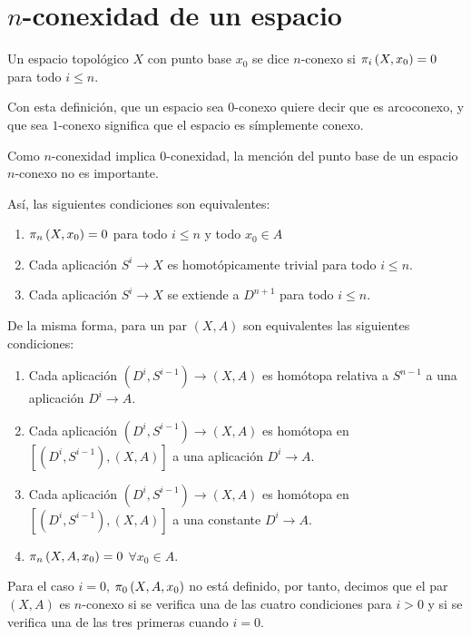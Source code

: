 \section{$n$-conexidad de un espacio}
\begin{defin}
Un espacio topológico $X$ con punto base $x_0$ se dice $n$-conexo si $\pi_{i}\left(X, x_0\right) = 0$ para todo $i \leq n$.
\end{defin}
Con esta definición, que un espacio sea $0$-conexo quiere decir que es arcoconexo, y que sea $1$-conexo significa que el espacio es símplemente conexo. \par
Como $n$-conexidad implica $0$-conexidad, la mención del punto base de un espacio $n$-conexo no es importante. \par
Así, las siguientes condiciones son equivalentes:
\begin{enumerate}
\item $\pi_{n}\left(X, x_0\right) = 0$ para todo $i \leq n$ y todo $x_0 \in A$
\item Cada aplicación $S^i \longrightarrow X$ es homotópicamente trivial para todo $i \leq n$.
\item Cada aplicación $S^i \longrightarrow X$ se extiende a $D^{n+1}$ para todo $i \leq n$.
\end{enumerate}
De la misma forma, para un par $(X, A)$ son equivalentes las siguientes condiciones:
\begin{enumerate}
\item Cada aplicación $(D^i, S^{i-1}) \longrightarrow (X, A)$ es homótopa relativa a $S^{n-1}$ a una aplicación $D^i \longrightarrow A$.
\item Cada aplicación $(D^i, S^{i-1}) \longrightarrow (X, A)$ es homótopa en $[(D^i, S^{i-1}), (X, A)]$ a una aplicación $D^i \longrightarrow A$.
\item Cada aplicación $(D^i, S^{i-1}) \longrightarrow (X, A)$ es homótopa en $[(D^i, S^{i-1}), (X, A)]$ a una constante $D^i \longrightarrow A$.
\item $\pi_{n}\left(X, A, x_0\right) = 0$ $\forall x_0 \in A$.
\end{enumerate}
Para el caso $i = 0$, $\pi_{0}\left(X, A, x_0\right)$ no está definido, por tanto, decimos que el par $(X, A)$ es $n$-conexo si se verifica una de las cuatro condiciones para $i > 0$ y si se verifica una de las tres primeras cuando $i=0$.

